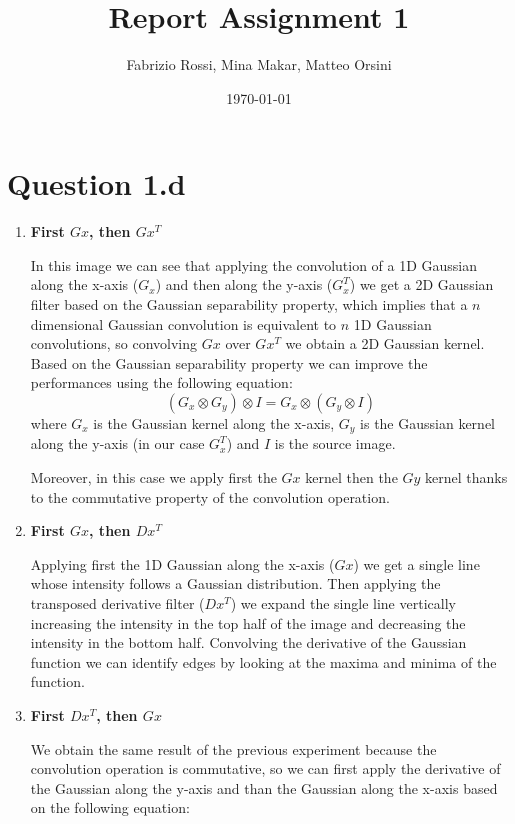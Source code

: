 \documentclass{article}
\title{Report Assignment 1}
\author{Fabrizio Rossi, Mina Makar, Matteo Orsini}
\date{\today}
\begin{document}
\begin{titlepage}
\clearpage\maketitle
\thispagestyle{empty}
\end{titlepage}

\section*{Question 1.d}

\begin{enumerate}
\item \textbf{First $Gx$, then $Gx^T$}

In this image we can see that applying the convolution of a 1D Gaussian along the x-axis ($G_x$) and then along the y-axis ($G_x^T$) we get a 2D Gaussian filter based on the Gaussian separability property, which implies that a $n$ dimensional Gaussian convolution is equivalent to $n$ 1D Gaussian convolutions, so convolving $Gx$ over $Gx^T$ we obtain a 2D Gaussian kernel.
Based on the Gaussian separability property we can improve the performances using the following equation:
\begin{equation}
(G_x \otimes G_y) \otimes I = G_x \otimes (G_y \otimes I)
\end{equation}
where $G_x$ is the Gaussian kernel along the x-axis, $G_y$ is the Gaussian kernel along the y-axis (in our case $G_x^T$) and $I$ is the source image.

Moreover, in this case we apply first the $Gx$ kernel then the $Gy$ kernel thanks to the commutative property of the convolution operation.

\item \textbf{First $Gx$, then $Dx^T$}

Applying first the 1D Gaussian along the x-axis ($Gx$) we get a single line whose intensity follows a Gaussian distribution. Then applying the transposed derivative filter ($Dx^T$) we expand the single line vertically increasing the intensity in the top half of the image and decreasing the intensity in the bottom half. Convolving the derivative of the Gaussian function we can identify edges by looking at the maxima and minima of the function.

\item \textbf{First $Dx^T$, then $Gx$}

We obtain the same result of the previous experiment because the convolution operation is commutative, so we can first apply the derivative of the Gaussian along the y-axis and than the Gaussian along the x-axis based on the following equation:


\end{enumerate}
\end{document}
